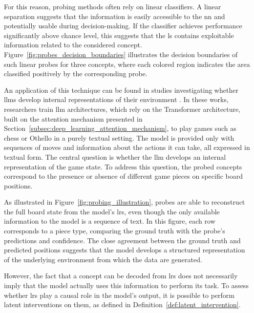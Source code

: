For this reason, probing methods often rely on linear classifiers.
A linear separation suggests that the information is easily accessible to the \gls{nn} and potentially usable during decision-making.
If the classifier achieves performance significantly above chance level, this suggests that the \gls{ls} contains exploitable information related to the considered concept.
Figure~\ref{fig:probes_decision_boundaries} illustrates the decision boundaries of such linear probes for three concepts, where each colored region indicates the area classified positively by the corresponding probe.



An application of this technique can be found in studies investigating whether \glspl{llm} develop internal representations of their environment \parencite{li2024emergentworldrepresentationsexploring, karvonen2024emergentworldmodelslatent}.
In these works, researchers train \gls{llm} architectures, which rely on the Transformer architecture, built on the attention mechanism presented in Section~\ref{subsec:deep_learning_attention_mechanism}, to play games such as chess or Othello in a purely textual setting.
The model is provided only with sequences of moves and information about the actions it can take, all expressed in textual form.
The central question is whether the \gls{llm} develops an internal representation of the game state.
To address this question, the probed concepts correspond to the presence or absence of different game pieces on specific board positions.

As illustrated in Figure~\ref{fig:probing_illustration}, probes are able to reconstruct the full board state from the model's \glspl{lr}, even though the only available information to the model is a sequence of text.
In this figure, each row corresponds to a piece type, comparing the ground truth with the probe's predictions and confidence.
The close agreement between the ground truth and predicted positions suggests that the model develops a structured representation of the underlying environment from which the data are generated.



However, the fact that a concept can be decoded from \glspl{lr} does not necessarily imply that the model actually uses this information to perform its task.
To assess whether \glspl{lr} play a causal role in the model's output, it is possible to perform latent interventions on them, as defined in Definition~\ref{def:latent_intervention}.

